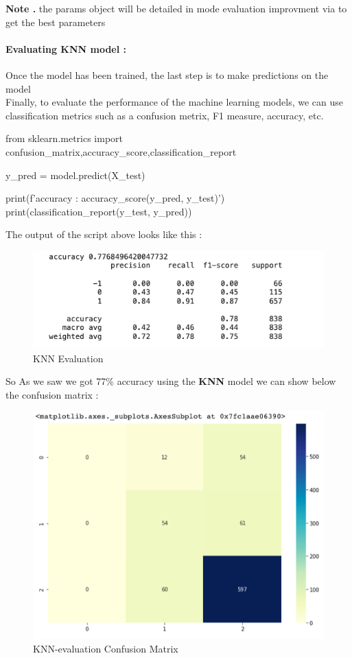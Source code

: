 \documentclass{article}
\begin{document}
\textbf{Note .} the params object will be detailed in mode evaluation improvment via  to get the best parameters

\paragraph{ Evaluating KNN model :}
Once the model has been trained, the last step is to make predictions on the model \\
Finally, to evaluate the performance of the machine learning models, we can use classification metrics such as a confusion metrix, F1 measure, accuracy, etc.
\begin{code}
from sklearn.metrics import confusion_matrix,accuracy_score,classification_report

y_pred = model.predict(X_test)

print(f'accuracy : {accuracy_score(y_pred, y_test)}')
print(classification_report(y_test, y_pred))

\end{code}
The output of the script above looks like this :
\begin{figure}[H]
    \centering
    \includegraphics[scale=0.55]{src/img/knn_acc.png}
    \caption{KNN Evaluation}
    \label{fig:my_label}
\end{figure}
So As we saw we got 77\% accuracy using the \textbf{KNN} model we can show below the confusion matrix :
\begin{figure}[H]
    \centering
    \includegraphics[scale=0.4]{src/img/knn_cm.png}
    \caption{KNN-evaluation Confusion Matrix}
    \label{fig:my_label}
\end{figure}
\end{document}
